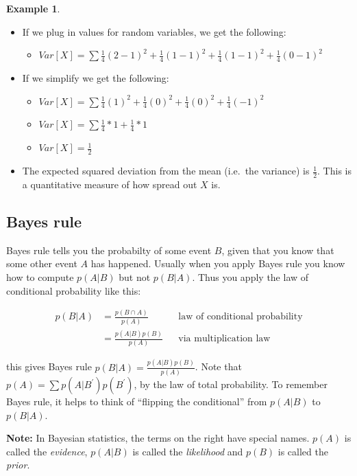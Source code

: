 \documentclass[]{article}
\theoremstyle{definition}
\newtheorem{exmp}{Example}[section]
\begin{document}
\begin{exmp}
\begin{itemize}
\begin{itemize}
   \end{itemize}
\item If we plug in values for random variables, we get the following: 
  \begin{itemize}
   \item[] $Var[X] =  \sum \frac{1}{4} (2 -1)^2 +  \frac{1}{4} (1 -1)^2 +   \frac{1}{4}(1 -1)^2 +  \frac{1}{4}(0 -1)^2$
   \end{itemize}
\item If we simplify we get the following:
 	 \begin{itemize}
   	\item[] $Var[X] =  \sum \frac{1}{4} (1)^2 +  \frac{1}{4} (0)^2 +   \frac{1}{4}(0)^2 +  \frac{1}{4}(-1)^2$
   	\item[] $Var[X] =  \sum \frac{1}{4} * 1 +  \frac{1}{4} * 1$
   	\item[] $Var[X] = \frac{1}{2}$
   	\end{itemize}
\item The expected squared deviation from the mean (i.e.\ the variance) is $\frac{1}{2}$. This is a quantitative measure of how spread out $X$ is.
\end{itemize}

\end{exmp} 

\subsection{Bayes rule}

Bayes rule tells you the probabilty of some event $B$, given that you know that some other event $A$ has happened. Usually when you apply Bayes rule you know how to compute $p(A|B)$ but not $p(B|A)$. Thus you apply the law of conditional probability like this: 

\begin{align*}
p(B \vert A) &= \frac{p(B \cap A)}{p(A)} && \text{law of conditional probability} \\
       &= \frac{p(A \vert B)p(B)}{p(A)} && \text{via multiplication law}
\end{align*}

\noindent this gives Bayes rule $p(B \vert A) = \frac{p(A \vert B)p(B)}{p(A)}$. Note that $p(A) = \sum p(A|B^\prime)p(B^\prime)$, by the law of total probability. To remember Bayes rule, it helps to think of ``flipping the conditional'' from $p(A \vert B)$ to $p(B \vert A)$. 


\textbf{Note:} In Bayesian statistics, the terms on the right have special names. $p(A)$ is called the \textit{evidence}, $p(A \vert B)$ is called the \textit{likelihood} and $p(B)$ is called the \textit{prior}. 
\end{document}
